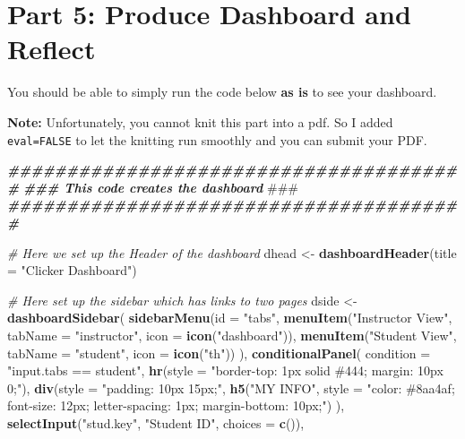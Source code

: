 \documentclass[
]{article}
\newenvironment{Shaded}{\begin{snugshade}}{\end{snugshade}}
\newcommand{\AlertTok}[1]{\textcolor[rgb]{0.94,0.16,0.16}{#1}}
\newcommand{\AttributeTok}[1]{\textcolor[rgb]{0.13,0.29,0.53}{#1}}
\newcommand{\CommentTok}[1]{\textcolor[rgb]{0.56,0.35,0.01}{\textit{#1}}}
\newcommand{\DocumentationTok}[1]{\textcolor[rgb]{0.56,0.35,0.01}{\textbf{\textit{#1}}}}
\newcommand{\FunctionTok}[1]{\textcolor[rgb]{0.13,0.29,0.53}{\textbf{#1}}}
\newcommand{\NormalTok}[1]{#1}
\newcommand{\OtherTok}[1]{\textcolor[rgb]{0.56,0.35,0.01}{#1}}
\newcommand{\StringTok}[1]{\textcolor[rgb]{0.31,0.60,0.02}{#1}}
\begin{document}
\section{Part 5: Produce Dashboard and
Reflect}\label{part-5-produce-dashboard-and-reflect}

You should be able to simply run the code below \textbf{as is} to see
your dashboard.

\textbf{Note:} Unfortunately, you cannot knit this part into a pdf. So I
added \texttt{eval=FALSE} to let the knitting run smoothly and you can
submit your PDF.

\begin{Shaded}
\begin{Highlighting}[]
\DocumentationTok{\#\#\#\#\#\#\#\#\#\#\#\#\#\#\#\#\#\#\#\#\#\#\#\#\#\#\#\#\#\#\#\#\#\#\#\#\#\#\#}
\DocumentationTok{\#\#\# This code creates the dashboard }\AlertTok{\#\#\#}
\DocumentationTok{\#\#\#\#\#\#\#\#\#\#\#\#\#\#\#\#\#\#\#\#\#\#\#\#\#\#\#\#\#\#\#\#\#\#\#\#\#\#\#}

\CommentTok{\# Here we set up the Header of the dashboard}
\NormalTok{dhead }\OtherTok{\textless{}{-}} \FunctionTok{dashboardHeader}\NormalTok{(}\AttributeTok{title =} \StringTok{"Clicker Dashboard"}\NormalTok{)}

\CommentTok{\# Here set up the sidebar which has links to two pages}
\NormalTok{dside }\OtherTok{\textless{}{-}} \FunctionTok{dashboardSidebar}\NormalTok{(}
  \FunctionTok{sidebarMenu}\NormalTok{(}\AttributeTok{id =} \StringTok{"tabs"}\NormalTok{, }
    \FunctionTok{menuItem}\NormalTok{(}\StringTok{"Instructor View"}\NormalTok{, }\AttributeTok{tabName =} \StringTok{"instructor"}\NormalTok{, }\AttributeTok{icon =} \FunctionTok{icon}\NormalTok{(}\StringTok{"dashboard"}\NormalTok{)),}
    \FunctionTok{menuItem}\NormalTok{(}\StringTok{"Student View"}\NormalTok{, }\AttributeTok{tabName =} \StringTok{"student"}\NormalTok{, }\AttributeTok{icon =} \FunctionTok{icon}\NormalTok{(}\StringTok{"th"}\NormalTok{))}
\NormalTok{  ),}
  \FunctionTok{conditionalPanel}\NormalTok{(}
    \AttributeTok{condition =} \StringTok{"input.tabs == \textquotesingle{}student\textquotesingle{}"}\NormalTok{,}
    \FunctionTok{hr}\NormalTok{(}\AttributeTok{style =} \StringTok{"border{-}top: 1px solid \#444; margin: 10px 0;"}\NormalTok{),}
    \FunctionTok{div}\NormalTok{(}\AttributeTok{style =} \StringTok{"padding: 10px 15px;"}\NormalTok{, }
        \FunctionTok{h5}\NormalTok{(}\StringTok{"MY INFO"}\NormalTok{, }\AttributeTok{style =} \StringTok{"color: \#8aa4af; font{-}size: 12px; letter{-}spacing: 1px; margin{-}bottom: 10px;"}\NormalTok{)}
\NormalTok{    ),}
    \FunctionTok{selectInput}\NormalTok{(}\StringTok{"stud.key"}\NormalTok{, }\StringTok{"Student ID"}\NormalTok{, }\AttributeTok{choices =} \FunctionTok{c}\NormalTok{()),}
    

\end{Highlighting}
\end{Shaded}
\end{document}
